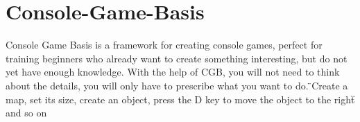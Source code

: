 \chapter{Console-\/\+Game-\/\+Basis}
\hypertarget{md__r_e_a_d_m_e}{}\label{md__r_e_a_d_m_e}
\label{md__r_e_a_d_m_e_autotoc_md12}%
%
 Console Game Basis is a framework for creating console games, perfect for training beginners who already want to create something interesting, but do not yet have enough knowledge. With the help of CGB, you will not need to think about the details, you will only have to prescribe what you want to do. \"{}\+Create a map, set its size, create an object, press the \textquotesingle{}\+D\textquotesingle{} key to move the object to the right\"{} and so on 